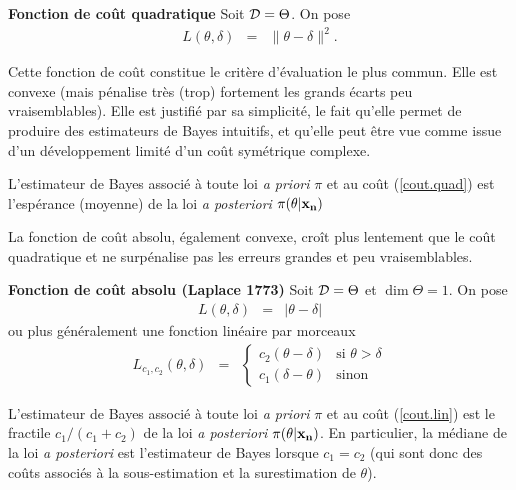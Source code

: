 \begin{exo}{\bf Fonction de coût quadratique}
Soit ${\cal{D}}=\Theta$. On pose
\begin{eqnarray}
L(\theta,\delta) & = & \|\theta-\delta\|^2. \label{cout.quad}
\end{eqnarray}
\end{exo}

Cette fonction de coût constitue le critère d'évaluation le plus commun. Elle est convexe (mais pénalise très (trop) fortement les grands écarts peu vraisemblables). Elle est justifié par sa simplicité, le fait qu'elle permet de produire des estimateurs de Bayes intuitifs, et qu'elle peut \^etre vue comme issue d'un développement limité d'un co\^ut symétrique complexe.


\begin{proposition}\label{prop1}
L'estimateur de Bayes associé à toute loi {\it a priori} $\pi$ et au co\^ut (\ref{cout.quad}) est l'espérance (moyenne) de la loi {\it a posteriori} $\pi(\theta|{\bf x_n})$
\end{proposition}
\if{} 
\fi

\vspace{0.5cm}

La fonction de coût absolu, également convexe, croît plus lentement que le coût quadratique et ne surpénalise pas les erreurs grandes et peu vraisemblables.  \\

\begin{exo}{\bf Fonction de coût absolu (Laplace 1773)}
Soit ${\cal{D}}=\Theta$ et $\dim\Theta=1$. On pose
\begin{eqnarray}
L(\theta,\delta) & = & |\theta-\delta| \label{cout.abs}
\end{eqnarray}
ou plus généralement une fonction linéaire par morceaux 
\begin{eqnarray}
L_{c_1,c_2}(\theta,\delta) & = & \left\{\begin{array}{ll} c_2(\theta-\delta) & \text{si $\theta>\delta$} \\ c_1(\delta-\theta) & \text{sinon} 
\end{array} \right. \label{cout.lin}
\end{eqnarray}
\end{exo}

\begin{proposition}\label{prop2}
L'estimateur de Bayes associé à toute loi {\it a priori} $\pi$ et au co\^ut (\ref{cout.lin}) est le fractile $c_1/(c_1+c_2)$ de la loi {\it a posteriori} $\pi(\theta|{\bf x_n})$. En particulier, la médiane de la loi {\it a posteriori} est l'estimateur de Bayes lorsque $c_1=c_2$ (qui sont donc des co\^uts associés à la sous-estimation et la surestimation de $\theta$).
\end{proposition}
\if{} 
\fi

